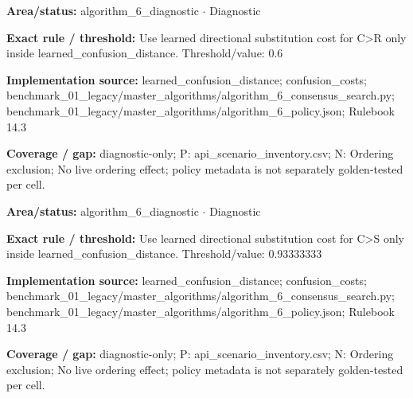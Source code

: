 \begin{tcolorbox}[enhanced,breakable,colback=white,colframe=Muted!45,boxrule=0.45pt,arc=1.5pt,left=6pt,right=6pt,top=5pt,bottom=5pt,title={\texttt{A6-LEARNED-SUBSTITUTION-C-R}},title after break={\texttt{A6-LEARNED-SUBSTITUTION-C-R}\ (continued)},fonttitle=\headingfont\bfseries\color{Navy},coltitle=Navy]
\textbf{Area/status:} algorithm\_\allowbreak{}6\_\allowbreak{}diagnostic $\boldsymbol{\cdot}$ Diagnostic\par
\smallskip
\textbf{Exact rule / threshold:} Use learned directional substitution cost for C>R only inside learned\_\allowbreak{}confusion\_\allowbreak{}distance. Threshold/\allowbreak{}value: 0.6\par
\smallskip
\textbf{Implementation source:} learned\_\allowbreak{}confusion\_\allowbreak{}distance; confusion\_\allowbreak{}costs; benchmark\_\allowbreak{}01\_\allowbreak{}legacy/\allowbreak{}master\_\allowbreak{}algorithms/\allowbreak{}algorithm\_\allowbreak{}6\_\allowbreak{}consensus\_\allowbreak{}search.py; benchmark\_\allowbreak{}01\_\allowbreak{}legacy/\allowbreak{}master\_\allowbreak{}algorithms/\allowbreak{}algorithm\_\allowbreak{}6\_\allowbreak{}policy.json; Rulebook 14.3\par
\smallskip
\textbf{Coverage / gap:} diagnostic-only; P: api\_\allowbreak{}scenario\_\allowbreak{}inventory.csv; N: Ordering exclusion; No live ordering effect; policy metadata is not separately golden-tested per cell.
\end{tcolorbox}
\begin{tcolorbox}[enhanced,breakable,colback=white,colframe=Muted!45,boxrule=0.45pt,arc=1.5pt,left=6pt,right=6pt,top=5pt,bottom=5pt,title={\texttt{A6-LEARNED-SUBSTITUTION-C-S}},title after break={\texttt{A6-LEARNED-SUBSTITUTION-C-S}\ (continued)},fonttitle=\headingfont\bfseries\color{Navy},coltitle=Navy]
\textbf{Area/status:} algorithm\_\allowbreak{}6\_\allowbreak{}diagnostic $\boldsymbol{\cdot}$ Diagnostic\par
\smallskip
\textbf{Exact rule / threshold:} Use learned directional substitution cost for C>S only inside learned\_\allowbreak{}confusion\_\allowbreak{}distance. Threshold/\allowbreak{}value: 0.93333333\par
\smallskip
\textbf{Implementation source:} learned\_\allowbreak{}confusion\_\allowbreak{}distance; confusion\_\allowbreak{}costs; benchmark\_\allowbreak{}01\_\allowbreak{}legacy/\allowbreak{}master\_\allowbreak{}algorithms/\allowbreak{}algorithm\_\allowbreak{}6\_\allowbreak{}consensus\_\allowbreak{}search.py; benchmark\_\allowbreak{}01\_\allowbreak{}legacy/\allowbreak{}master\_\allowbreak{}algorithms/\allowbreak{}algorithm\_\allowbreak{}6\_\allowbreak{}policy.json; Rulebook 14.3\par
\smallskip
\textbf{Coverage / gap:} diagnostic-only; P: api\_\allowbreak{}scenario\_\allowbreak{}inventory.csv; N: Ordering exclusion; No live ordering effect; policy metadata is not separately golden-tested per cell.
\end{tcolorbox}
